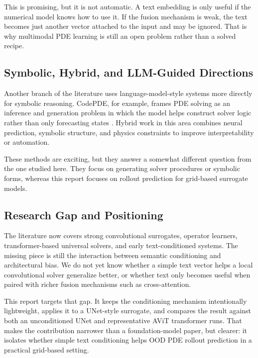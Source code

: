 \documentclass[
]{article}
\begin{document}
This is promising, but it is not automatic. A text embedding is only
useful if the numerical model knows how to use it. If the fusion
mechanism is weak, the text becomes just another vector attached to the
input and may be ignored. That is why multimodal PDE learning is still
an open problem rather than a solved recipe.

\subsection{Symbolic, Hybrid, and LLM-Guided
Directions}\label{symbolic-hybrid-and-llm-guided-directions}

Another branch of the literature uses language-model-style systems more
directly for symbolic reasoning. CodePDE, for example, frames PDE
solving as an inference and generation problem in which the model helps
construct solver logic rather than only forecasting states
\citep{codepde2025}. Hybrid work in this area combines neural
prediction, symbolic structure, and physics constraints to improve
interpretability or automation.

These methods are exciting, but they answer a somewhat different
question from the one studied here. They focus on generating solver
procedures or symbolic forms, whereas this report focuses on rollout
prediction for grid-based surrogate models.

\subsection{Research Gap and
Positioning}\label{research-gap-and-positioning}

The literature now covers strong convolutional surrogates, operator
learners, transformer-based universal solvers, and early
text-conditioned systems. The missing piece is still the interaction
between semantic conditioning and architectural bias. We do not yet know
whether a simple text vector helps a local convolutional solver
generalize better, or whether text only becomes useful when paired with
richer fusion mechanisms such as cross-attention.

This report targets that gap. It keeps the conditioning mechanism
intentionally lightweight, applies it to a UNet-style surrogate, and
compares the result against both an unconditioned UNet and
representative AViT transformer runs. That makes the contribution
narrower than a foundation-model paper, but clearer: it isolates whether
simple text conditioning helps OOD PDE rollout prediction in a practical
grid-based setting.
\end{document}
